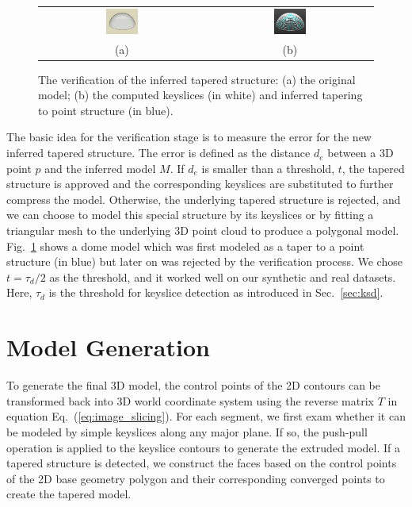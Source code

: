 \documentclass[10pt,journal,cspaper,compsoc]{IEEEtran}
\newcommand{\Eq}[1] {Eq.~(\ref{eq:#1})}
\newcommand{\Fig}[1]{Fig.~\ref{fig:#1}}
\newcommand{\Sec}[1]{Sec.~\ref{sec:#1}}
\begin{document}
\begin{figure}[htbp]
\begin{center}
\begin{tabular}{cc}
\includegraphics[width=0.2\textwidth]{taper_dome_0.png} &
\includegraphics[width=0.2\textwidth]{taper_dome_4.png} \\
(a) & (b)
\end{tabular}
\end{center}
\caption{The verification of the inferred tapered structure:
(a) the original model;
(b) the computed keyslices (in white) and inferred tapering to point structure (in blue).
}
\label{fig:taper_taper_dome}
\end{figure}

The basic idea for the verification stage is to measure the error 
for the new inferred tapered structure. 
The error is defined as the distance $d_e$ between a 3D point $p$ and 
the inferred model $M$.
If $d_e$ is smaller than a threshold, $t$, the tapered structure is approved and 
the corresponding keyslices are substituted to further compress the model.
Otherwise, the underlying tapered structure is rejected,
and we can choose to model this special structure by its keyslices or
by fitting a triangular mesh to the underlying 3D point cloud
to produce a polygonal model.
\Fig{taper_taper_dome} shows a dome model which was first modeled
as a taper to a point structure (in blue)
but later on was rejected by the verification process.
We chose $t = \tau_d/2$ as the threshold, 
and it worked well on our synthetic and real datasets.
Here, $\tau_d$ is the threshold for keyslice detection 
as introduced in \Sec{ksd}.

\section{Model Generation}
To generate the final 3D model, the control
points of the 2D contours can be transformed back into 3D world coordinate system
using the reverse matrix $T$ in equation \Eq{image_slicing}.
For each segment, we first exam whether it can be modeled 
by simple keyslices along any major plane.
If so, the push-pull operation is applied to the keyslice contours to
generate the extruded model.
If a tapered structure is detected, we construct the faces
based on the control points of the 2D base geometry polygon 
and their corresponding converged points to create the tapered model.
\end{document}
